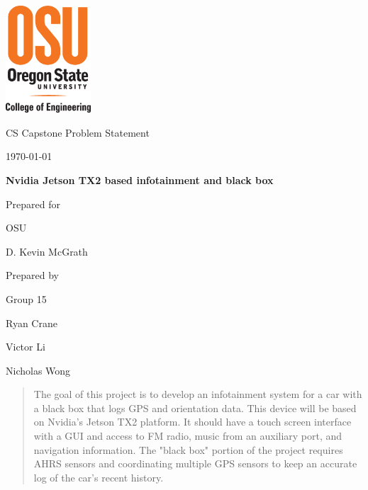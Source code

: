 \documentclass[onecolumn, draftclsnofoot,10pt, compsoc]{IEEEtran}
\def \CapstoneTeamNumber{		15}
\def \GroupMemberOne{			Ryan Crane}
\def \GroupMemberTwo{			Victor Li}
\def \GroupMemberThree{			Nicholas Wong}
\def \CapstoneProjectName{		Nvidia Jetson TX2 based infotainment and black box}
\def \CapstoneSponsorCompany{	OSU}
\def \CapstoneSponsorPerson{		D. Kevin McGrath}
\def \DocType{		Problem Statement
				}
\newcommand{\NameSigPair}[1]{\par
\makebox[2.75in][r]{#1} \hfil 	\makebox[3.25in]{\makebox[2.25in]{\hrulefill} \hfill		\makebox[.75in]{\hrulefill}}
\par\vspace{-12pt} \textit{\tiny\noindent
\makebox[2.75in]{} \hfil		\makebox[3.25in]{\makebox[2.25in][r]{Signature} \hfill	\makebox[.75in][r]{Date}}}}
\renewcommand{\NameSigPair}[1]{#1}
\begin{document}
\begin{titlepage}
    \begin{singlespace}
    	\includegraphics[height=4cm]{coe_v_spot1}
        \hfill
        \par\vspace{.2in}
        \centering
        \scshape{
            \huge CS Capstone\DocType \par
            {\large\today}\par
            \vspace{.5in}
            \textbf{\Huge\CapstoneProjectName}\par
            \vfill
            {\large Prepared for}\par
            \Huge \CapstoneSponsorCompany\par
            \vspace{5pt}
            {\Large\NameSigPair{\CapstoneSponsorPerson}\par}
            {\large Prepared by }\par
            Group\CapstoneTeamNumber\par
            \vspace{5pt}
            {\Large
                \NameSigPair{\GroupMemberOne}\par
                \NameSigPair{\GroupMemberTwo}\par
                \NameSigPair{\GroupMemberThree}\par
            }
            \vspace{20pt}
        }
        \begin{abstract}
        	The goal of this project is to develop an infotainment system for a car with a black box that logs
					GPS and orientation data. This device will be based on Nvidia's Jetson TX2 platform. It should
					have a touch screen interface with a GUI and access to FM radio, music from an auxiliary port,
					and navigation information. The "black box" portion of the project requires AHRS sensors
					and coordinating multiple GPS sensors to keep an accurate log of the car's recent history.
        \end{abstract}
    \end{singlespace}
\end{titlepage}
\newpage
{}
\clearpage
\end{document}
